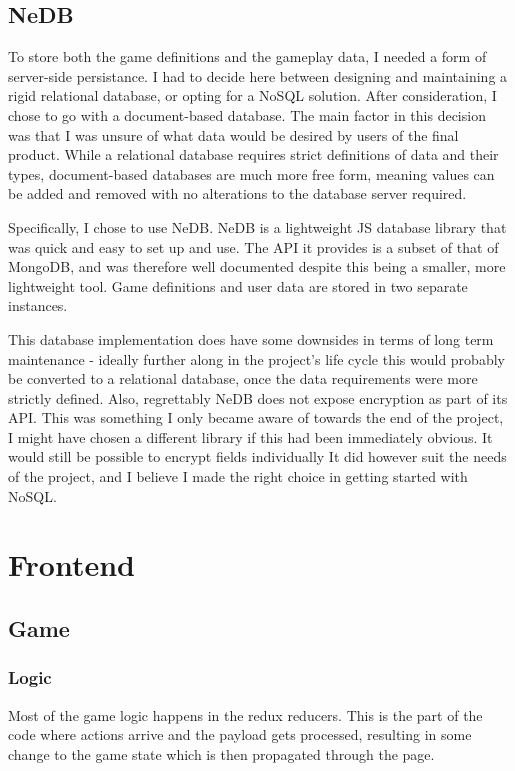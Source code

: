 \subsection{NeDB}
To store both the game definitions and the gameplay data, I needed a form of server-side persistance. I had to decide here between designing and maintaining a rigid relational database, or opting for a NoSQL\cite{NoSQL} solution. After consideration, I chose to go with a document-based database. The main factor in this decision was that I was unsure of what data would be desired by users of the final product. While a relational database requires strict definitions of data and their types, document-based databases are much more free form, meaning values can be added and removed with no alterations to the database server required.

Specifically, I chose to use NeDB\cite{NeDB}. NeDB is a lightweight JS database library that was quick and easy to set up and use. The API it provides is a subset of that of MongoDB\cite{MongoDB}, and was therefore well documented despite this being a smaller, more lightweight tool. Game definitions and user data are stored in two separate instances.

This database implementation does have some downsides in terms of long term maintenance - ideally further along in the project's life cycle this would probably be converted to a relational database, once the data requirements were more strictly defined. Also, regrettably NeDB does not expose encryption as part of its API.
This was something I only became aware of towards the end of the project, I might have chosen a different library if this had been immediately obvious. It would still be possible to encrypt fields individually
It did however suit the needs of the project, and I believe I made the right choice in getting started with NoSQL.

\section{Frontend}

\subsection{Game}

\subsubsection{Logic}
Most of the game logic happens in the redux reducers. 
This is the part of the code where actions arrive and the payload gets processed, resulting in some change to the game state which is then propagated through the page.

